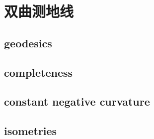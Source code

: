 \section{双曲测地线}
\label{b3:sec:1302}


\subsection{geodesics}
\label{b3:subsec:130201}

\subsection{completeness}
\label{b3:subsec:130202}

\subsection{constant negative curvature}
\label{b3:subsec:130203}

\subsection{isometries}
\label{b3:subsec:130204}


